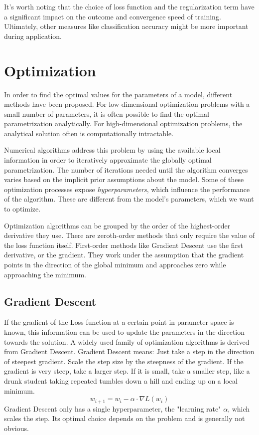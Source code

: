 \documentclass[twoside,12pt,a4paper]{report}
\begin{document}
It's worth noting that the choice of loss function and the regularization term have a significant impact on the outcome and convergence speed of training. Ultimately, other measures like classification accuracy might be more important during application.

\section{Optimization}
In order to find the optimal values for the parameters of a model, different methods have been proposed. For low-dimensional optimization problems with a small number of parameters, it is often possible to find the optimal parametrization analytically. For high-dimensional optimization problems, the analytical solution often is computationally intractable. 

Numerical algorithms address this problem by using the available local information in order to iteratively approximate the globally optimal parametrization. The number of iterations needed until the algorithm converges varies based on the implicit prior assumptions about the model.
Some of these optimization processes expose \textit{hyperparameters}, which influence the performance of the algorithm. These are different from the model's parameters, which we want to optimize.

Optimization algorithms can be grouped by the order of the highest-order derivative they use.
There are zeroth-order methods that only require the value of the loss function itself.
First-order methods like Gradient Descent use the first derivative, or the gradient. They work under the assumption that the gradient points in the direction of the global minimum and approaches zero while approaching the minimum.

\subsection{Gradient Descent}
If the gradient of the Loss function at a certain point in parameter space is known, this information can be used to update the parameters in the direction towards the solution. A widely used family of optimization algorithms is derived from Gradient Descent. Gradient Descent means: Just take a step in the direction of steepest gradient. Scale the step size by the steepness of the gradient. If the gradient is very steep, take a larger step. If it is small, take a smaller step, like a drunk student taking repeated tumbles down a hill and ending up on a local minimum.
$$w_{i+1} = w_i - \alpha \cdot \nabla L(w_i) $$
Gradient Descent only has a single hyperparameter, the "learning rate" $\alpha$, which scales the step. Its optimal choice depends on the problem and is generally not obvious.
\end{document}
